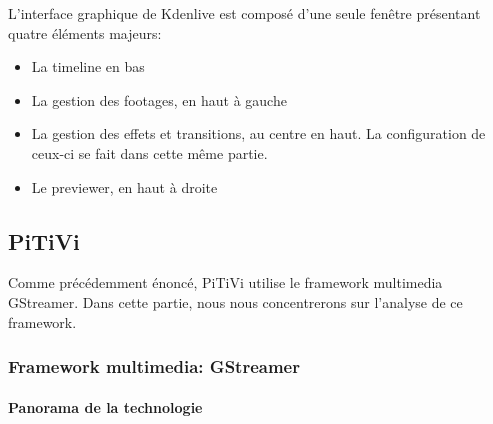 L'interface graphique de Kdenlive est composé d'une seule fenêtre 
présentant quatre éléments majeurs:

\begin{itemize}

  \item {La timeline en bas}

  \item {La gestion des footages, en haut à gauche}

  \item {La gestion des effets et transitions, au centre en haut. La
  configuration de ceux-ci se fait dans cette même partie.}

  \item {Le previewer, en haut à droite}

\end{itemize}

\subsection {PiTiVi}

Comme précédemment énoncé, PiTiVi utilise le framework multimedia
GStreamer. Dans cette partie, nous nous concentrerons sur l'analyse
de ce framework.

\subsubsection {Framework multimedia: GStreamer}

\paragraph {Panorama de la technologie} %

\subparagraph{}

